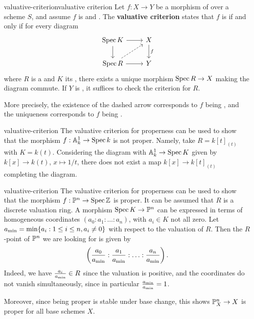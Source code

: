 \begin{topic}{valuative-criterion}{valuative criterion}
    Let $f : X \to Y$ be a morphism of  over a scheme $S$, and assume $f$ is  and . The \textbf{valuative criterion} states that $f$ is  if and only if for every diagram
    \[ \begin{tikzcd}
        \Spec K \arrow{r} \arrow{d} & X \arrow{d}{f} \\ \Spec R \arrow[dashed]{ur} \arrow{r} & Y
    \end{tikzcd} \]
    where $R$ is a  and $K$ its , there exists a unique morphism $\operatorname{Spec} R \to X$ making the diagram commute. If $Y$ is , it suffices to check the criterion for  $R$.
    
    More precisely, the existence of the dashed arrow corresponds to $f$ being , and the uniqueness corresponds to $f$ being .
\end{topic}

\begin{example}{valuative-criterion}
    The valuative criterion for properness can be used to show that the morphism $f : \mathbb{A}^1_k \to \operatorname{Spec} k$ is not proper. Namely, take $R = k[t]_{(t)}$ with $K = k(t)$. Considering the diagram with $\mathbb{A}^1_k \to \operatorname{Spec} K$ given by $k[x] \to k(t)$, $x \mapsto 1/t$, there does not exist a map $k[x] \to k[t]_{(t)}$ completing the diagram.
\end{example}

\begin{example}{valuative-criterion}
    The valuative criterion for properness can be used to show that the morphism $f : \mathbb{P}^n \to \operatorname{Spec} \mathbb{Z}$ is proper. It can be assumed that $R$ is a discrete valuation ring. A morphism $\operatorname{Spec} K \to \mathbb{P}^n$ can be expressed in terms of homogeneous coordinates $(a_0 : a_1 : \ldots : a_n)$, with $a_i \in K$ not all zero. Let $a_\textup{min} = \min \{ a_i : 1 \le i \le n, a_i \ne 0 \}$ with respect to the valuation of $R$. Then the $R$-point of $\mathbb{P}^n$ we are looking for is given by
    \[ \left( \frac{a_0}{a_\textup{min}} : \frac{a_1}{a_\textup{min}} : \ldots : \frac{a_n}{a_\textup{min}} \right) . \]
    Indeed, we have $\frac{a_i}{a_\textup{min}} \in R$ since the valuation is positive, and the coordinates do not vanish simultaneously, since in particular $\frac{a_\textup{min}}{a_\textup{min}} = 1$.
    
    Moreover, since being proper is stable under base change, this shows $\mathbb{P}^n_X \to X$ is proper for all base schemes $X$.
\end{example}

